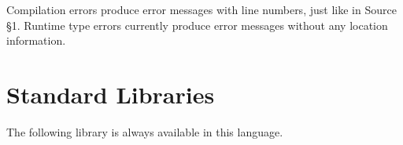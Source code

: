 Compilation errors produce error messages with line numbers, just like in Source \S 1.  Runtime type errors currently produce error messages without any location information.







\newpage















\section{Standard Libraries}

The following library is always available in this language.







